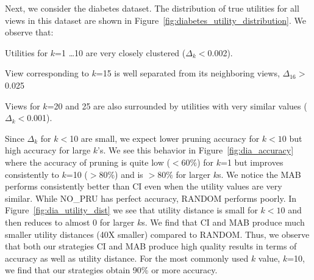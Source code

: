 Next, we consider the diabetes dataset.
The distribution of true utilities for all views in this dataset are shown in
Figure~\ref{fig:diabetes_utility_distribution}.
We observe that:
\begin{denselist}
\item Utilities for $k$=1 \ldots 10 are very closely clustered ($\Delta_k<$0.002).
\item View corresponding to $k$=15 is well separated from its neighboring views, $\Delta_{16} >$ 0.025
\item Views for $k$=20 and 25 are also surrounded by utilities with very 
similar values ($\Delta_k < $0.001).
\end{denselist}
Since $\Delta_k$ for $k<$10 are small, we expect lower pruning accuracy for $k<10$ but high accuracy for
large $k$'s.
We see this behavior in Figure~\ref{fig:dia_accuracy} where the accuracy of
pruning is quite low ($<60\%$) for $k$=1 but improves consistently to $k$=10 
($>80\%$) and is $>80\%$ for larger $k$s.
We notice the MAB performs consistently better than CI even when the utility
values are very similar.
While NO\_PRU has perfect accuracy, RANDOM performs poorly. 
In Figure~\ref{fig:dia_utility_dist} we see that
utility distance is small for $k<10$ and then reduces to almost 0 for larger
$k$s.
We find that CI and MAB produce much smaller utility distances (40X smaller)
compared to RANDOM.
Thus, we observe that both our strategies CI and MAB produce high quality results 
in terms of accuracy as well as utility distance. 
For the most commonly used $k$ value, $k$=10, we find that our strategies obtain 
90\% or more accuracy.




